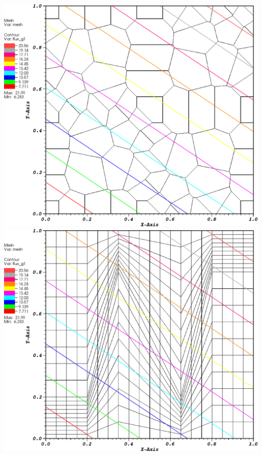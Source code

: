 \documentclass[compress,10pt]{beamer}
\begin{document}
\begin{frame}[t]
{\begin{columns}
{}\includegraphics[width=0.95\columnwidth]{images/smooth_poly_MAXENT_k1.eps} 
\centering
{}\includegraphics[width=0.95\columnwidth]{images/z_quad_MAXENT_k1.eps} \\
\vspace{3mm}

\end{columns}}
\end{frame}
\end{document}
